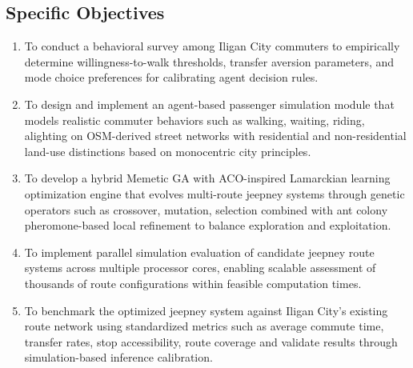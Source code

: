 \subsection{Specific Objectives}
\begin{enumerate}
  \item To conduct a behavioral survey among Iligan City commuters to empirically determine willingness-to-walk thresholds, transfer aversion parameters, and mode choice preferences for calibrating agent decision rules.
  \item To design and implement an agent-based passenger simulation module that models realistic commuter behaviors such as walking, waiting, riding, alighting on \ac{OSM}-derived street networks with residential and non-residential land-use distinctions based on monocentric city principles.
  \item To develop a hybrid Memetic \ac{GA} with \ac{ACO}-inspired Lamarckian learning optimization engine that evolves multi-route jeepney systems through genetic operators such as crossover, mutation, selection combined with ant colony pheromone-based local refinement to balance exploration and exploitation.
  \item To implement parallel simulation evaluation of candidate jeepney route systems across multiple processor cores, enabling scalable assessment of thousands of route configurations within feasible computation times.
  \item To benchmark the optimized jeepney system against Iligan City’s existing route network using standardized metrics such as average commute time, transfer rates, stop accessibility, route coverage and validate results through simulation-based inference calibration.
\end{enumerate}


